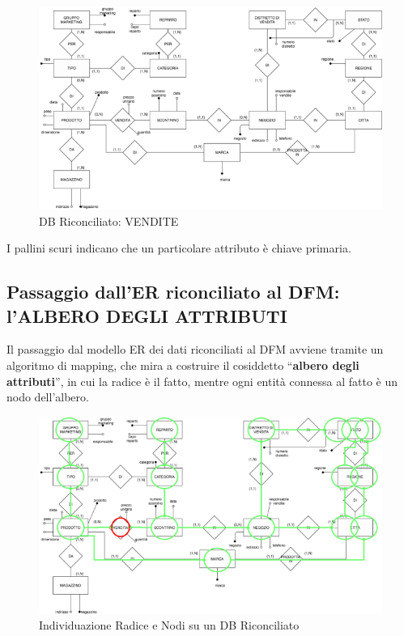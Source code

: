 \begin{center}
\begin{figure}[H]
\centering
\includegraphics[scale=0.8]{figures/riconciliato_vendite.png}
\caption{DB Riconciliato: VENDITE}
\end{figure}
\end{center}

I pallini scuri indicano che un particolare attributo è chiave primaria.

\subsection{Passaggio dall’ER riconciliato al DFM: l’ALBERO DEGLI ATTRIBUTI}

Il passaggio dal modello ER dei dati riconciliati al DFM avviene tramite un algoritmo di mapping, che mira a costruire il cosiddetto “\textbf{albero degli attributi}”, in cui la radice è il fatto, mentre ogni entità connessa al fatto è un nodo dell’albero. 

\begin{center}
\begin{figure}[H]
\centering
\includegraphics[scale=0.8]{figures/pre_attributes_tree.png}
\caption{Individuazione Radice e Nodi su un DB Riconciliato}
\end{figure}
\end{center}

